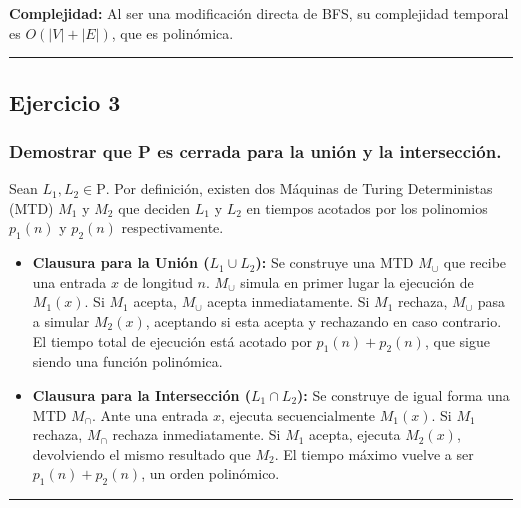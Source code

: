 \documentclass[12pt]{book} %
\providecommand{\tightlist}{%
  \setlength{\itemsep}{0pt}\setlength{\parskip}{0pt}}
\begin{document}
\textbf{Complejidad:} Al ser una modificación directa de BFS, su
complejidad temporal es \textbf{\(O(|V| + |E|)\)}, que es polinómica.

\begin{center}\rule{0.5\linewidth}{0.5pt}\end{center}

\hypertarget{ejercicio-3-1}{%
\subsection{Ejercicio 3}\label{ejercicio-3-1}}

\hypertarget{demostrar-que-p-es-cerrada-para-la-uniuxf3n-y-la-intersecciuxf3n.}{%
\subsubsection{Demostrar que P es cerrada para la unión y la
intersección.}\label{demostrar-que-p-es-cerrada-para-la-uniuxf3n-y-la-intersecciuxf3n.}}

Sean \(L_1, L_2 \in \text{P}\). Por definición, existen dos Máquinas de
Turing Deterministas (MTD) \(M_1\) y \(M_2\) que deciden \(L_1\) y
\(L_2\) en tiempos acotados por los polinomios \(p_1(n)\) y \(p_2(n)\)
respectivamente.

\begin{itemize}
\tightlist
\item
  \textbf{Clausura para la Unión (\(L_1 \cup L_2\)):} Se construye una
  MTD \(M_{\cup}\) que recibe una entrada \(x\) de longitud \(n\).
  \(M_{\cup}\) simula en primer lugar la ejecución de \(M_1(x)\). Si
  \(M_1\) acepta, \(M_{\cup}\) acepta inmediatamente. Si \(M_1\)
  rechaza, \(M_{\cup}\) pasa a simular \(M_2(x)\), aceptando si esta
  acepta y rechazando en caso contrario. El tiempo total de ejecución
  está acotado por \(p_1(n) + p_2(n)\), que sigue siendo una función
  polinómica.
\item
  \textbf{Clausura para la Intersección (\(L_1 \cap L_2\)):} Se
  construye de igual forma una MTD \(M_{\cap}\). Ante una entrada \(x\),
  ejecuta secuencialmente \(M_1(x)\). Si \(M_1\) rechaza, \(M_{\cap}\)
  rechaza inmediatamente. Si \(M_1\) acepta, ejecuta \(M_2(x)\),
  devolviendo el mismo resultado que \(M_2\). El tiempo máximo vuelve a
  ser \(p_1(n) + p_2(n)\), un orden polinómico.
\end{itemize}

\begin{center}\rule{0.5\linewidth}{0.5pt}\end{center}
\end{document}
